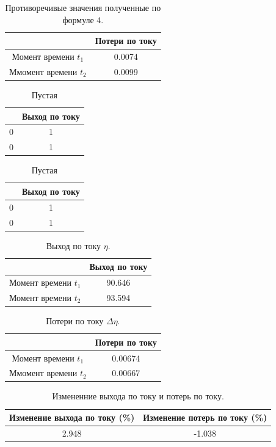 \documentclass{article}
\begin{document}
\begin{table}[ht]
\centering
\begin{tabular}{|c|c|}
\hline
			&Потери по току	\\
\hline
Момент времени $t_1$		&0.0074\\ 
Ммомент времени $t_2$		&0.0099\\  
\hline
\end{tabular}
\caption{Противоречивые значения полученные по формуле 4.}
\end{table}

\begin{table}[ht]
\centering
\begin{tabular}{|c|c|}
\hline
			&Выход по току	\\
\hline
0		&1	\\ 
0		&1	\\  
\hline
\end{tabular}
\caption{Пустая}
\end{table}
\begin{table}[ht]
\centering
\begin{tabular}{|c|c|}
\hline
			&Выход по току	\\
\hline
0		&1	\\ 
0		&1	\\  
\hline
\end{tabular}
\caption{Пустая}
\end{table}

\begin{table}[ht]
\centering
\begin{tabular}{|c|c|}
\hline
			&Выход по току	\\
\hline
Момент времени $t_1$		&90.646	\\ 
Момент времени $t_2$		&93.594	\\  
\hline
\end{tabular}
\caption{Выход по току $\eta$.}
\end{table}

\begin{table}[ht]
\centering
\begin{tabular}{|c|c|}
\hline
			&Потери по току	\\
\hline
Момент времени $t_1$		&0.00674\\ 
Ммомент времени $t_2$		&0.00667\\  
\hline
\end{tabular}
\caption{Потери по току $\Delta \eta$.}
\end{table}

\begin{table}[ht]
\centering
\begin{tabular}{|c|c|}
\hline
Изменение выхода по току (\%)	& Изменение потерь по току (\%) \\
\hline
2.948 & -1.038\\ 
\hline
\end{tabular}
\caption{Измененние выхода по току и потерь по току.}
\end{table}
\end{document}
